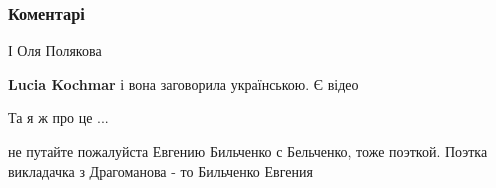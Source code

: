  
 
 
 
 
\subsubsection{Коментарі}
\label{sec:26_01_2021.fb.helgiv_oleg.1.zakon_mova.cmt}

\begin{itemize}
 
І Оля Полякова

\begin{itemize}
 
\textbf{Lucia Kochmar} і вона заговорила українською. Є відео

 
Та я ж про це ...
\end{itemize}

 
не путайте пожалуйста Евгению Бильченко с Бельченко, тоже поэткой. Поэтка
викладачка з Драгоманова - то Бильченко Евгения

\begin{itemize}
 

\end{itemize}
\end{itemize}
